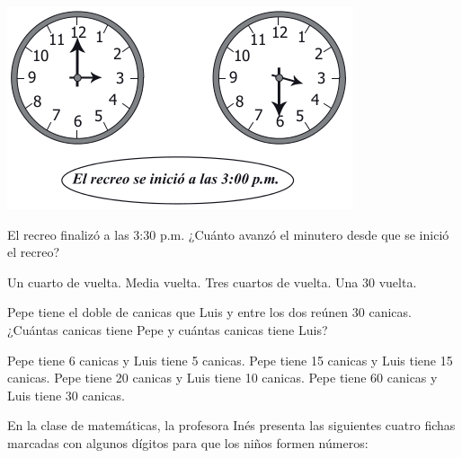 \documentclass[10pt,letterpaper,addpoints]{exam}
\begin{document}
\begin{multicols}{2}
\begin{center}
 \includegraphics[scale=.55]{Images/relojes.png}
 \end{center} 
\begin{questions}
\question El recreo finalizó a las 3:30 p.m. ¿Cuánto avanzó el minutero desde que se inició el recreo?
\begin{choices}
\choice Un cuarto de vuelta.
\CorrectChoice Media vuelta.
\choice Tres cuartos de vuelta.
\choice Una 30 vuelta.
\end{choices}
\question Pepe tiene el doble de canicas que Luis y entre los dos reúnen 30 canicas. ¿Cuántas canicas tiene Pepe y cuántas canicas tiene Luis?
\begin{choices}
\choice Pepe tiene 6 canicas y Luis tiene 5 canicas.
\choice Pepe tiene 15 canicas y Luis tiene 15 canicas.
\CorrectChoice Pepe tiene 20 canicas y Luis tiene 10 canicas.
\choice Pepe tiene 60 canicas y Luis tiene 30 canicas.
\end{choices}
\question En la clase de matemáticas, la profesora Inés presenta las siguientes cuatro fichas marcadas con algunos dígitos para que los niños formen números:
\begin{center}
\end{center}
\end{questions}
\end{multicols}
\end{document}
